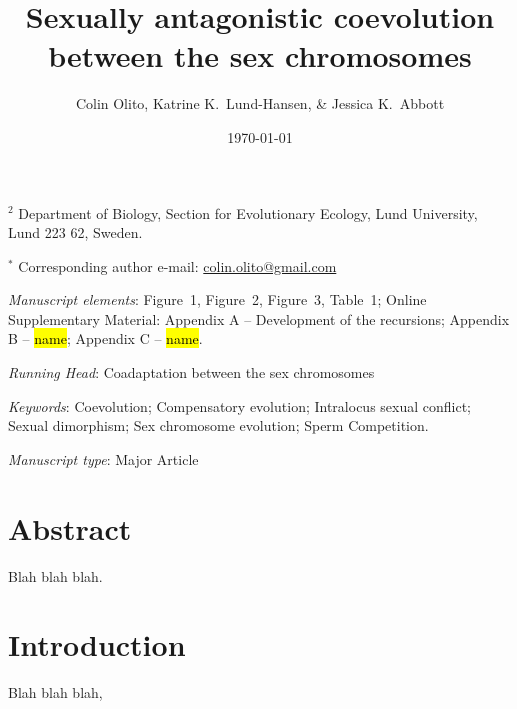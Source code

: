 \documentclass{article}
\title{Sexually antagonistic coevolution between the sex chromosomes}
\author{Colin Olito, Katrine K.~Lund-Hansen, \& Jessica K.~Abbott}
\date{\today}
\makeatletter
\renewcommand\@seccntformat[1]{}
\makeatother
\begin{document}
\maketitle

\noindent{} $^{2}$ Department of Biology, Section for Evolutionary Ecology, Lund University, Lund 223 62, Sweden.

\noindent{} $^{\ast}$ Corresponding author e-mail: \url{colin.olito@gmail.com}

\bigskip

\noindent{} \textit{Manuscript elements}: Figure~1, Figure~2, Figure~3, Table~1; Online Supplementary Material: Appendix A -- Development of the recursions; Appendix B -- \hl{name}; Appendix C -- \hl{name}.

\bigskip
\noindent{} \textit{Running Head}: Coadaptation between the sex chromosomes

\bigskip

\noindent{} \textit{Keywords}: Coevolution; Compensatory evolution; Intralocus sexual conflict;  Sexual dimorphism; Sex chromosome evolution; Sperm Competition.

\bigskip

\noindent{} \textit{Manuscript type}: Major Article

\bigskip


\linenumbers
\modulolinenumbers[1]
\renewcommand\linenumberfont{\normalfont\small}

\renewcommand{\@seccntformat}[1]{}

\newpage{}
\section*{Abstract}

\noindent{} Blah blah blah.
\newpage{}


\section*{Introduction}

Blah blah blah, \citep{Andersson1994}



\end{document}

